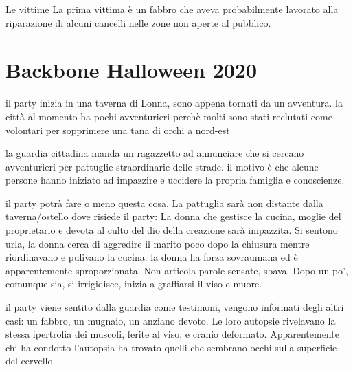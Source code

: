 \documentclass[10pt,twoside, twocolumn, openany]{dndbook}
\begin{document}
\begin{paperbox}{Le vittime}
La prima vittima è un fabbro che aveva probabilmente lavorato alla riparazione di alcuni cancelli nelle zone non aperte al pubblico.

\end{paperbox}

\clearpage

\section{Backbone Halloween 2020}

il party inizia in una taverna di Lonna, sono appena tornati da un avventura.
la città al momento ha pochi avventurieri perchè molti sono stati reclutati come volontari per sopprimere una tana di orchi a nord-est 

la guardia cittadina manda un ragazzetto ad annunciare che si cercano avventurieri per pattuglie straordinarie delle strade.
il motivo è che alcune persone hanno iniziato ad impazzire e uccidere la propria famiglia e conoscienze.

il party potrà fare o meno questa cosa. La pattuglia sarà non distante dalla taverna/ostello dove risiede il party: La donna che gestisce la cucina, moglie del proprietario e devota al culto del dio della creazione sarà impazzita.
Si sentono urla, la donna cerca di aggredire il marito poco dopo la chiusura mentre riordinavano e pulivano la cucina.
la donna ha forza sovraumana ed è apparentemente sproporzionata. Non articola parole sensate, sbava. Dopo un po', comunque sia, si irrigidisce, inizia a graffiarsi il viso e muore. 

il party viene sentito dalla guardia come testimoni, vengono informati degli altri casi: un fabbro, un mugnaio, un anziano devoto.
Le loro autopsie rivelavano la stessa ipertrofia dei muscoli, ferite al viso, e cranio deformato. Apparentemente chi ha condotto l'autopsia ha trovato quelli che sembrano occhi sulla superficie del cervello.
\end{document}
